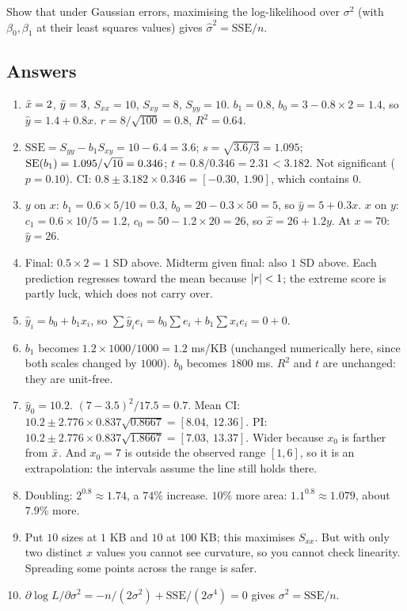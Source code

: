 \begin{exercise}
Show that under Gaussian errors, maximising the log-likelihood over $\sigma^2$
(with $\beta_0,\beta_1$ at their least squares values) gives
$\hat\sigma^2 = \mathrm{SSE}/n$.
\end{exercise}

\subsection*{Answers}

\begin{enumerate}[leftmargin=*]
  \item $\bar{x}=2$, $\bar{y}=3$, $S_{xx}=10$, $S_{xy}=8$, $S_{yy}=10$.
  $b_1=0.8$, $b_0=3-0.8\times2=1.4$, so $\hat y = 1.4+0.8x$.
  $r = 8/\sqrt{100}=0.8$, $R^2=0.64$.
  \item $\mathrm{SSE} = S_{yy}-b_1S_{xy} = 10-6.4=3.6$; $s=\sqrt{3.6/3}=1.095$;
  $\operatorname{SE}(b_1)=1.095/\sqrt{10}=0.346$; $t=0.8/0.346=2.31<3.182$. Not significant
  ($p=0.10$). CI: $0.8\pm3.182\times0.346 = [-0.30,\ 1.90]$, which contains $0$.
  \item $y$ on $x$: $b_1 = 0.6\times5/10=0.3$, $b_0=20-0.3\times50=5$, so
  $\hat y=5+0.3x$. $x$ on $y$: $c_1=0.6\times10/5=1.2$, $c_0=50-1.2\times20=26$,
  so $\hat x=26+1.2y$. At $x=70$: $\hat y = 26$.
  \item Final: $0.5\times2 = 1$ SD above. Midterm given final: also $1$ SD
  above. Each prediction regresses toward the mean because $\lvert r\rvert<1$; the
  extreme score is partly luck, which does not carry over.
  \item $\hat y_i = b_0+b_1x_i$, so
  $\sum\hat y_ie_i = b_0\sum e_i + b_1\sum x_ie_i = 0+0$.
  \item $b_1$ becomes $1.2\times1000/1000=1.2$ ms/KB (unchanged numerically
  here, since both scales changed by $1000$). $b_0$ becomes $1800$ ms. $R^2$
  and $t$ are unchanged: they are unit-free.
  \item $\hat y_0=10.2$. $(7-3.5)^2/17.5=0.7$. Mean CI:
  $10.2\pm2.776\times0.837\sqrt{0.8667} = [8.04,\ 12.36]$. PI:
  $10.2\pm2.776\times0.837\sqrt{1.8667}=[7.03,\ 13.37]$. Wider because $x_0$ is
  farther from $\bar{x}$. And $x_0=7$ is outside the observed range $[1,6]$, so it
  is an extrapolation: the intervals assume the line still holds there.
  \item Doubling: $2^{0.8}\approx1.74$, a $74\%$ increase. $10\%$ more area:
  $1.1^{0.8}\approx1.079$, about $7.9\%$ more.
  \item Put $10$ sizes at $1$ KB and $10$ at $100$ KB; this maximises
  $S_{xx}$. But with only two distinct $x$ values you cannot see curvature, so
  you cannot check linearity. Spreading some points across the range is safer.
  \item $\partial\log L/\partial\sigma^2 = -n/(2\sigma^2) +
  \mathrm{SSE}/(2\sigma^4)=0$ gives $\sigma^2 = \mathrm{SSE}/n$.
\end{enumerate}
